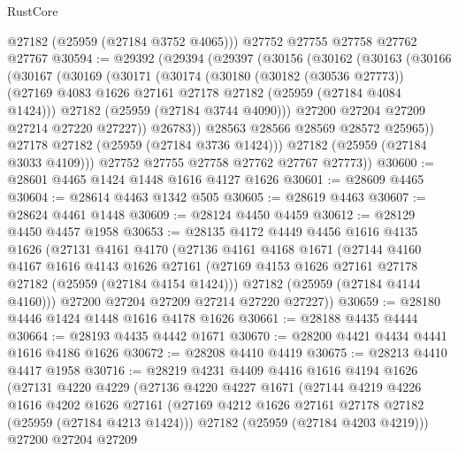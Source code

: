 \begin{lexlean}{RustCore}
\begin{coremodule}
      @27182
      (@25959 (@27184 @3752 @4065)))
    @27752
    @27755
    @27758
    @27762
    @27767
@30594 := @29392
    (@29394
      (@29397
        (@30156
          (@30162
            (@30163
              (@30166
                (@30167
                  (@30169
                    (@30171
                      (@30174
                        (@30180
                          (@30182 (@30536 @27773))
                          (@27169 @4083 @1626 @27161 @27178 @27182 (@25959 (@27184 @4084 @1424)))
                          @27182
                          (@25959 (@27184 @3744 @4090)))
                        @27200
                        @27204
                        @27209
                        @27214
                        @27220
                        @27227))
                    @26783))
                @28563
                @28566
                @28569
                @28572
                @25965))
            @27178
            @27182
            (@25959 (@27184 @3736 @1424)))
          @27182
          (@25959 (@27184 @3033 @4109)))
        @27752
        @27755
        @27758
        @27762
        @27767
        @27773))
@30600 := @28601 @4465 @1424 @1448 @1616 @4127 @1626
@30601 := @28609 @4465
@30604 := @28614 @4463 @1342 @505
@30605 := @28619 @4463
@30607 := @28624 @4461 @1448
@30609 := @28124 @4450 @4459
@30612 := @28129 @4450 @4457 @1958
@30653 := @28135
    @4172
    @4449
    @4456
    @1616
    @4135
    @1626
    (@27131
      @4161
      @4170
      (@27136
        @4161
        @4168
        @1671
        (@27144
          @4160
          @4167
          @1616
          @4143
          @1626
          @27161
          (@27169 @4153 @1626 @27161 @27178 @27182 (@25959 (@27184 @4154 @1424)))
          @27182
          (@25959 (@27184 @4144 @4160)))
        @27200
        @27204
        @27209
        @27214
        @27220
        @27227))
@30659 := @28180 @4446 @1424 @1448 @1616 @4178 @1626
@30661 := @28188 @4435 @4444
@30664 := @28193 @4435 @4442 @1671
@30670 := @28200 @4421 @4434 @4441 @1616 @4186 @1626
@30672 := @28208 @4410 @4419
@30675 := @28213 @4410 @4417 @1958
@30716 := @28219
    @4231
    @4409
    @4416
    @1616
    @4194
    @1626
    (@27131
      @4220
      @4229
      (@27136
        @4220
        @4227
        @1671
        (@27144
          @4219
          @4226
          @1616
          @4202
          @1626
          @27161
          (@27169 @4212 @1626 @27161 @27178 @27182 (@25959 (@27184 @4213 @1424)))
          @27182
          (@25959 (@27184 @4203 @4219)))
        @27200
        @27204
        @27209

\end{coremodule}
\end{lexlean}
